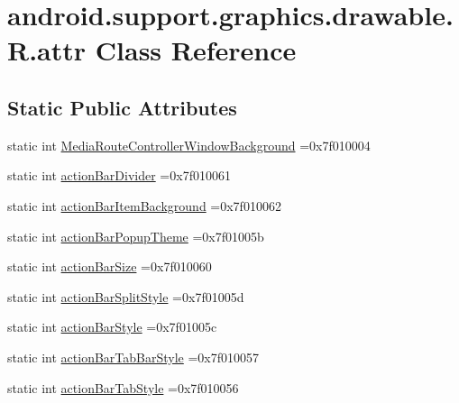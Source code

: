 \hypertarget{classandroid_1_1support_1_1graphics_1_1drawable_1_1R_1_1attr}{}\section{android.\+support.\+graphics.\+drawable.\+R.\+attr Class Reference}
\label{classandroid_1_1support_1_1graphics_1_1drawable_1_1R_1_1attr}
\subsection*{Static Public Attributes}
\begin{DoxyCompactItemize}
\item 
static int \hyperlink{classandroid_1_1support_1_1graphics_1_1drawable_1_1R_1_1attr_a2f1b42fac3ed284a8b5b345dfcdeb855}{Media\+Route\+Controller\+Window\+Background} =0x7f010004
\item 
static int \hyperlink{classandroid_1_1support_1_1graphics_1_1drawable_1_1R_1_1attr_a887954644b13b69b864e75b5cf6e882b}{action\+Bar\+Divider} =0x7f010061
\item 
static int \hyperlink{classandroid_1_1support_1_1graphics_1_1drawable_1_1R_1_1attr_a45de221f34b20c0a0bb0de5e58a5740a}{action\+Bar\+Item\+Background} =0x7f010062
\item 
static int \hyperlink{classandroid_1_1support_1_1graphics_1_1drawable_1_1R_1_1attr_aea9738f12530be44b271ae9a5b2674ce}{action\+Bar\+Popup\+Theme} =0x7f01005b
\item 
static int \hyperlink{classandroid_1_1support_1_1graphics_1_1drawable_1_1R_1_1attr_a6de126e08e2acf157e6f0456a378e36b}{action\+Bar\+Size} =0x7f010060
\item 
static int \hyperlink{classandroid_1_1support_1_1graphics_1_1drawable_1_1R_1_1attr_a21166b60d259bd01f92e065e54359fa1}{action\+Bar\+Split\+Style} =0x7f01005d
\item 
static int \hyperlink{classandroid_1_1support_1_1graphics_1_1drawable_1_1R_1_1attr_a63e89d71d4760c1db31cfacbff8d2e07}{action\+Bar\+Style} =0x7f01005c
\item 
static int \hyperlink{classandroid_1_1support_1_1graphics_1_1drawable_1_1R_1_1attr_a0cc70d5fcb3770f744cb04133c70f855}{action\+Bar\+Tab\+Bar\+Style} =0x7f010057
\item 
static int \hyperlink{classandroid_1_1support_1_1graphics_1_1drawable_1_1R_1_1attr_adccf1f2c165270f717de0a35385fdeb2}{action\+Bar\+Tab\+Style} =0x7f010056
\item 

\end{DoxyCompactItemize}
